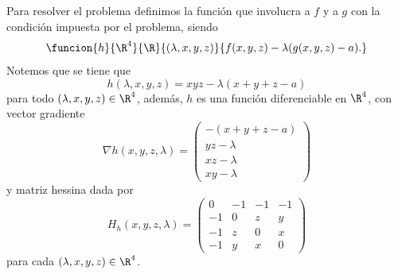 \documentclass[a4,11pt]{aleph-examen}
\begin{document}
\begin{preguntas}
\begin{respuesta}
\begin{respuesta}
\begin{respuesta}
\begin{enumerate}
\begin{respuesta}
        Para resolver el problema definimos la función que involucra a $f$ y a $g$ con la condición impuesta por el problema, siendo 
        \[
            \funcion{h}{\R^4}{\R}{(\lambda,x,y,z)}{f(x,y,z) - \lambda(g(x,y,z) - a).}
        \]
        Notemos que se tiene que
        \[
            h(\lambda,x,y,z) = xyz - \lambda(x+y+z-a)
        \]
        para todo $(\lambda,x,y,z)\in\R^4$, además, $h$ es una función diferenciable en $\R^4$, con vector gradiente 
        \[
            \nabla h(x,y,z,\lambda) = 
            \begin{pmatrix}
                -(x+y+z-a) \\
                yz - \lambda\\
                xz - \lambda\\
                xy - \lambda
            \end{pmatrix}
        \]
        y matriz hessina dada por
        \[
            H_h(x,y,z,\lambda) = 
            \begin{pmatrix}
                0 & -1 & -1 & -1\\
                -1 & 0 & z & y\\
                -1 & z & 0 & x\\
                -1 & y & x & 0
            \end{pmatrix}
        \]
        para cada $(\lambda,x,y,z)\in\R^4$.
        

\end{respuesta}
\end{enumerate}
\end{respuesta}
\end{respuesta}
\end{respuesta}
\end{preguntas}
\end{document}
